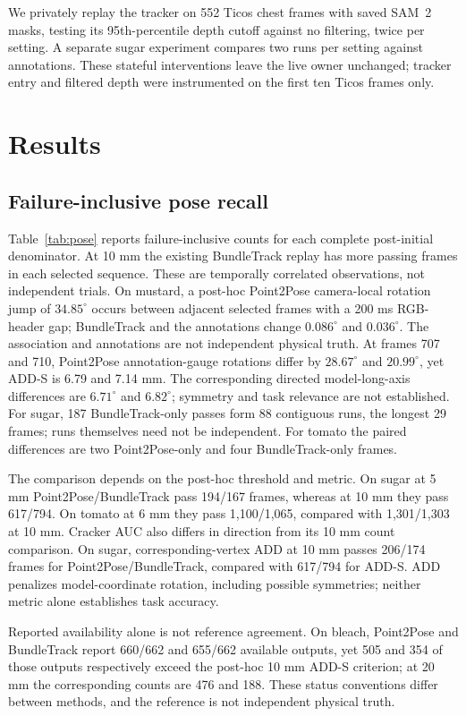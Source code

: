 \documentclass[10pt,journal]{IEEEtran}
\begin{document}
We privately replay the tracker on 552 Ticos chest frames with saved SAM~2 masks, testing its 95th-percentile depth cutoff against no filtering, twice per setting. A separate sugar experiment compares two runs per setting against annotations. These stateful interventions leave the live owner unchanged; tracker entry and filtered depth were instrumented on the first ten Ticos frames only.

\section{Results}
\subsection{Failure-inclusive pose recall}
Table~\ref{tab:pose} reports failure-inclusive counts for each complete post-initial denominator. At 10 mm the existing BundleTrack replay has more passing frames in each selected sequence. These are temporally correlated observations, not independent trials. On mustard, a post-hoc Point2Pose camera-local rotation jump of $34.85^\circ$ occurs between adjacent selected frames with a 200 ms RGB-header gap; BundleTrack and the annotations change $0.086^\circ$ and $0.036^\circ$. The association and annotations are not independent physical truth. At frames 707 and 710, Point2Pose annotation-gauge rotations differ by $28.67^\circ$ and $20.99^\circ$, yet ADD-S is 6.79 and 7.14 mm. The corresponding directed model-long-axis differences are $6.71^\circ$ and $6.82^\circ$; symmetry and task relevance are not established. For sugar, 187 BundleTrack-only passes form 88 contiguous runs, the longest 29 frames; runs themselves need not be independent. For tomato the paired differences are two Point2Pose-only and four BundleTrack-only frames.

The comparison depends on the post-hoc threshold and metric. On sugar at 5 mm Point2Pose/BundleTrack pass 194/167 frames, whereas at 10 mm they pass 617/794. On tomato at 6 mm they pass 1,100/1,065, compared with 1,301/1,303 at 10 mm. Cracker AUC also differs in direction from its 10 mm count comparison. On sugar, corresponding-vertex ADD at 10 mm passes 206/174 frames for Point2Pose/BundleTrack, compared with 617/794 for ADD-S. ADD penalizes model-coordinate rotation, including possible symmetries; neither metric alone establishes task accuracy.

Reported availability alone is not reference agreement. On bleach, Point2Pose and BundleTrack report 660/662 and 655/662 available outputs, yet 505 and 354 of those outputs respectively exceed the post-hoc 10 mm ADD-S criterion; at 20 mm the corresponding counts are 476 and 188. These status conventions differ between methods, and the reference is not independent physical truth.
\end{document}
